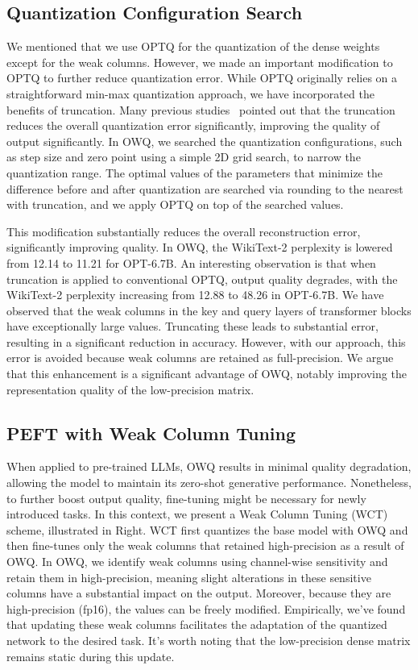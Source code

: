 \documentclass[letterpaper]{article} %
\begin{document}
\subsection{Quantization Configuration Search}

We mentioned that we use OPTQ for the quantization of the dense weights except for the weak columns. However, we made an important modification to OPTQ to further reduce quantization error. While OPTQ originally relies on a straightforward min-max quantization approach, we have incorporated the benefits of truncation. Many previous studies~\cite{esser2019learned, librecq, nahshan2021loss, weiqdrop} pointed out that the truncation reduces the overall quantization error significantly, improving the quality of output significantly. In OWQ, we searched the quantization configurations, such as step size and zero point using a simple 2D grid search, to narrow the quantization range. The optimal values of the parameters that minimize the difference before and after quantization are searched via rounding to the nearest with truncation, and we apply OPTQ on top of the searched values. 

This modification substantially reduces the overall reconstruction error, significantly improving quality.
In OWQ, the WikiText-2 perplexity is lowered from 12.14 to 11.21 for OPT-6.7B.
An interesting observation is that when truncation is applied to conventional OPTQ, output quality degrades, with the WikiText-2 perplexity increasing from 12.88 to 48.26 in OPT-6.7B. We have observed that the weak columns in the key and query layers of transformer blocks have exceptionally large values. Truncating these leads to substantial error, resulting in a significant reduction in accuracy. However, with our approach, this error is avoided because weak columns are retained as full-precision. We argue that this enhancement is a significant advantage of OWQ, notably improving the representation quality of the low-precision matrix.

\subsection{PEFT with Weak Column Tuning}
When applied to pre-trained LLMs, OWQ results in minimal quality degradation, allowing the model to maintain its zero-shot generative performance. Nonetheless, to further boost output quality, fine-tuning might be necessary for newly introduced tasks. In this context, we present a Weak Column Tuning (WCT) scheme, illustrated in  Right. 
WCT first quantizes the base model with OWQ and then fine-tunes only the weak columns that retained high-precision as a result of OWQ. 
In OWQ, we identify weak columns using channel-wise sensitivity and retain them in high-precision, meaning slight alterations in these sensitive columns have a substantial impact on the output. Moreover, because they are high-precision (fp16), the values can be freely modified. Empirically, we've found that updating these weak columns facilitates the adaptation of the quantized network to the desired task. It's worth noting that the low-precision dense matrix remains static during this update. 
\end{document}
